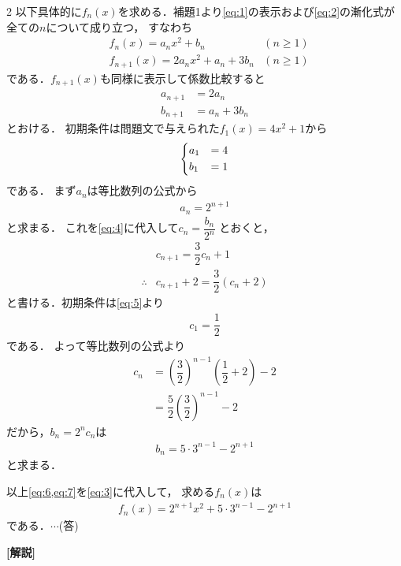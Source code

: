 \documentclass[../../main.tex]{subfiles}
\begin{document}
\begin{multicols}{2}
  以下具体的に$f_n(x)$を求める．補題1より\cref{eq:1}の表示および\cref{eq:2}の漸化式が全ての$n$について成り立つ，
  すなわち
  \begin{align}
    & f_n(x) = a_n x^2 + b_n               & (n \ge 1) \label{eq:3} \\
    & f_{n+1}(x) = 2 a_n x^2 + a_n + 3 b_n & (n \ge 1)
  \end{align}
  である．$f_{n+1}(x)$も同様に表示して係数比較すると
  \begin{align}
    a_{n+1} & = 2 a_n                           \\
    b_{n+1} & = a_n + 3 b_n \label{eq:4}
  \end{align}
  とおける．
  初期条件は問題文で与えられた$f_1(x) = 4 x^2 + 1$から
  \begin{align}
    \begin{dcases}
      a_1 & = 4 \\
      b_1 & = 1
    \end{dcases} \label{eq:5}
  \end{align}
  である．
  まず$a_n$は等比数列の公式から
  \begin{align}
    a_n = 2^{n+1} \label{eq:6}
  \end{align}
  と求まる．
  これを\cref{eq:4}に代入して$c_n = \dfrac{b_n}{2^n}$ とおくと，
  \begin{align}
    & c_{n+1}      = \dfrac{3}{2} c_n + 1   \\
    \therefore
    & c_{n+1} + 2  = \dfrac{3}{2} (c_n + 2)
  \end{align}
  と書ける．初期条件は\cref{eq:5}より
  \begin{align}
    c_1 = \dfrac{1}{2}
  \end{align}
  である．
  よって等比数列の公式より
  \begin{align}
    c_n
    & = \left(\dfrac{3}{2}\right)^{n-1} \left(\dfrac{1}{2}+2\right) - 2 \\
    & = \dfrac{5}{2}\left(\dfrac{3}{2}\right)^{n-1} - 2
  \end{align}
  だから，$b_n=2^n c_n$は
  \begin{align}
    b_n = 5 \cdot 3^{n-1} - 2^{n+1} \label{eq:7}
  \end{align}
  と求まる．

  以上\cref{eq:6,eq:7}を\cref{eq:3}に代入して，
  求める$f_n(x)$は
  \begin{align}
    f_n(x) = 2^{n+1} x^2 + 5 \cdot 3^{n-1} - 2^{n+1}
  \end{align}
  である．$\cdots$(答)

  {\bf [解説]}

  \newpage
\end{multicols}
\end{document}
